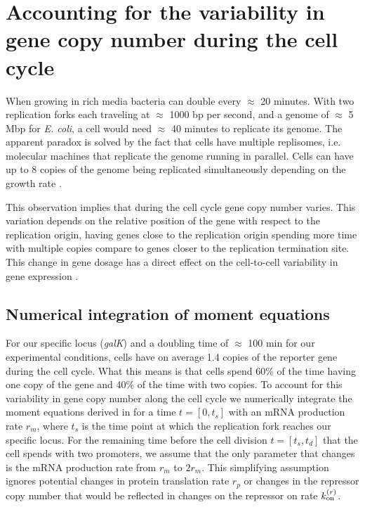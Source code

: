 \label{sec_multi_gene}
\section{Accounting for the variability in gene copy number during the cell
cycle}

When growing in rich media bacteria can double every $\approx$ 20 minutes. With
two replication forks each traveling at $\approx$ 1000 bp per second, and a
genome of $\approx$ 5 Mbp for {\it E. coli}\cite{Moran2010}, a cell would need
$\approx$ 40 minutes to replicate its genome. The apparent paradox is solved by
the fact that cells have multiple replisomes, i.e. molecular machines that
replicate the genome running in parallel. Cells can have up to 8 copies of the
genome being replicated simultaneously depending on the growth rate
\cite{Bremer1996}.

This observation implies that during the cell cycle gene copy number varies.
This variation depends on the relative position of the gene with respect to the
replication origin, having genes close to the replication origin spending more
time with multiple copies compare to genes closer to the replication termination
site. This change in gene dosage has a direct effect on the cell-to-cell
variability in gene expression \cite{Jones2014a, Peterson2015}.

\subsection{Numerical integration of moment equations}

For our specific locus ({\it galK}) and a doubling time of $\approx$ 100 min for
our experimental conditions, cells have on average 1.4 copies of the reporter
gene during the cell cycle. What this means is that cells spend 60\% of the time
having one copy of the gene and 40\% of the time with two copies. To account for
this variability in gene copy number along the cell cycle we numerically
integrate the moment equations derived in  for a time $t =
[0, t_s]$ with an mRNA production rate $r_m$, where $t_s$ is the time point at
which the replication fork reaches our specific locus. For the remaining time
before the cell division $t = [t_s, t_d]$ that the cell spends with two
promoters, we assume that the only parameter that changes is the mRNA production
rate from $r_m$ to $2 r_m$. This simplifying assumption ignores potential
changes in protein translation rate $r_p$ or changes in the repressor copy
number that would be reflected in changes on the repressor on rate $k^{(r)}_{\text{on}}$.


